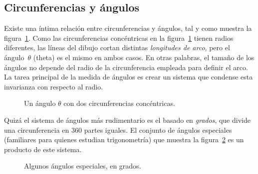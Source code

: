   \subsection{Circunferencias y ángulos} %
  \label{sec:circles_and_angles}

Existe una íntima relación entre circunferencias y ángulos, tal y como muestra la figura~\ref{fig:angle_arclength}. Como las circunferencias concéntricas en la figura~\ref{fig:angle_arclength} tienen radios diferentes, las líneas del dibujo cortan distintas \emph{longitudes de arco}, pero el ángulo~$\theta$ (theta) es el mismo en ambos casos. En otras palabras, el tamaño de los ángulos no depende del radio de la circunferencia empleada para definir el arco. La tarea principal de la medida de ángulos es crear un sistema que condense esta invarianza con respecto al radio.

\begin{figure}
\begin{center}
\end{center}
\caption{Un ángulo $\theta$ con dos circunferencias concéntricas.\label{fig:angle_arclength}}
\end{figure}

Quizá el sistema de ángulos más rudimentario es el basado en \emph{grados}, que divide una circunferencia en 360 partes iguales. El conjunto de ángulos especiales (familiares para quienes estudian trigonometría) que muestra la figura~\ref{fig:degree_angles} es un producto de este sistema.

\begin{figure}
\begin{center}
\end{center}
\caption{Algunos ángulos especiales, en grados.\label{fig:degree_angles}}
\end{figure}

